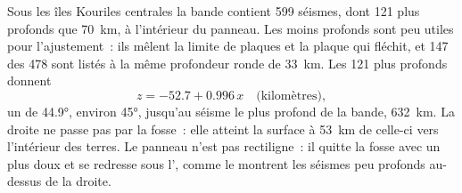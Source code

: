 Sous les îles Kouriles centrales la bande contient 599 séismes, dont 121
plus profonds que \qty{70}{km}, à l'intérieur du panneau. Les moins profonds sont peu utiles
pour l'ajustement~: ils mêlent la limite de plaques et la plaque qui fléchit, et 147 des
478 sont listés à la même profondeur ronde de \qty{33}{km}. Les 121 plus profonds donnent
\[
  z = -52.7 + 0.996\,x \quad\text{(kilomètres)},
\]
un  de \ang{44.9}, environ \ang{45}, jusqu'au séisme le plus profond de la bande,
\qty{632}{km}. La droite ne passe pas par la fosse~: elle atteint la
surface à \qty{53}{km} de celle-ci vers l'intérieur des terres. Le panneau n'est pas rectiligne~: il quitte la
fosse avec un  plus doux et se redresse sous l', comme le montrent les
séismes peu profonds au-dessus de la droite.

